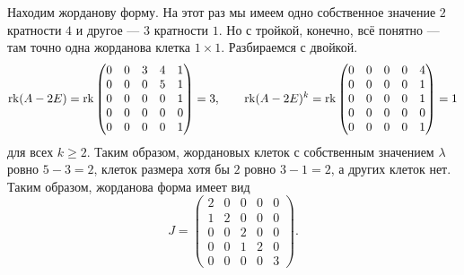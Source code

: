 \begin{solution}
	Находим жорданову форму. На этот раз мы имеем одно собственное значение $2$ кратности $4$ и другое --- $3$ кратности $1$. Но с тройкой, конечно, всё понятно --- там точно одна жорданова клетка $1 \times 1$. Разбираемся с двойкой.
	\begin{gather*}
		\operatorname{rk}(A - 2E) = \operatorname{rk}
		\begin{pmatrix}
			0 & 0 & 3 & 4 & 1\\
			0 & 0 & 0 & 5 & 1\\
			0 & 0 & 0 & 0 & 1\\
			0 & 0 & 0 & 0 & 0\\
			0 & 0 & 0 & 0 & 1
		\end{pmatrix} = 3,\qquad
		\operatorname{rk}(A - 2E)^k = \operatorname{rk}
		\begin{pmatrix}
			0 & 0 & 0 & 0 & 4\\
			0 & 0 & 0 & 0 & 1\\
			0 & 0 & 0 & 0 & 1\\
			0 & 0 & 0 & 0 & 0\\
			0 & 0 & 0 & 0 & 1
		\end{pmatrix} = 1
	\end{gather*}
	для всех $k \geqslant 2$. Таким образом, жордановых клеток с собственным значением $\lambda$ ровно $5 - 3 = 2$, клеток размера хотя бы $2$ ровно $3 - 1 = 2$, а других клеток нет. Таким образом, жорданова форма имеет вид
	\[
		J =
		\begin{pmatrix}
			2 & 0 & 0 & 0 & 0\\
			1 & 2 & 0 & 0 & 0\\
			0 & 0 & 2 & 0 & 0\\
			0 & 0 & 1 & 2 & 0\\
			0 & 0 & 0 & 0 & 3
		\end{pmatrix}.
	\]


\end{solution}
